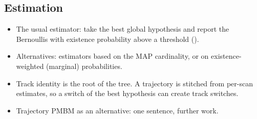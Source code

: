\subsection{Estimation}
\label{sec:pmbm-estimation}
\begin{itemize}
    \item The usual estimator: take the best global hypothesis and report the Bernoullis with existence probability above a threshold (\cite{garcia_2018_pmbm}).
    \item Alternatives: estimators based on the MAP cardinality, or on existence-weighted (marginal) probabilities.
    \item Track identity is the root of the tree. A trajectory is stitched from per-scan estimates, so a switch of the best hypothesis can create track switches.
    \item Trajectory PMBM as an alternative: one sentence, further work.
\end{itemize}
